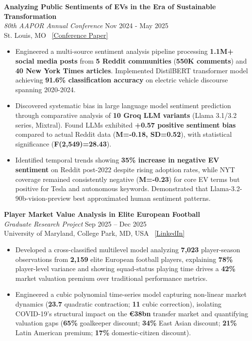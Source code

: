 \documentclass[11pt,letterpaper]{article}
\begin{document}
\textbf{Analyzing Public Sentiments of EVs in the Era of Sustainable Transformation}\\
\textit{80th AAPOR Annual Conference} \hfill Nov 2024 - May 2025\\
St. Louis, MO \textbar\ \href{https://aapor.confex.com/aapor/2025/meetingapp.cgi/Paper/3714}{[Conference Paper]}
\begin{itemize}[leftmargin=16pt, noitemsep, topsep=2pt]
    \item Engineered a multi-source sentiment analysis pipeline processing \textbf{1.1M+ social media posts} from \textbf{5 Reddit communities} (\textbf{550K comments}) and \textbf{40 New York Times articles}. Implemented DistilBERT transformer model achieving \textbf{91.6\% classification accuracy} on electric vehicle discourse spanning 2020-2024.
    
    \item Discovered systematic bias in large language model sentiment prediction through comparative analysis of \textbf{10 Groq LLM variants} (Llama 3.1/3.2 series, Mixtral). Found LLMs exhibited \textbf{+0.57 positive sentiment bias} compared to actual Reddit data (\textbf{M=-0.18, SD=0.52}), with statistical significance (\textbf{F(2,549)=28.43}).
    
    \item Identified temporal trends showing \textbf{35\% increase in negative EV sentiment} on Reddit post-2022 despite rising adoption rates, while NYT coverage remained consistently negative (\textbf{M=-0.23}) for core EV terms but positive for Tesla and autonomous keywords. Demonstrated that Llama-3.2-90b-vision-preview best approximated human sentiment patterns.
\end{itemize}



\vspace{6pt}
\textbf{Player Market Value Analysis in Elite European Football}\\
\textit{Graduate Research Project} \hfill Sep 2025 -- Dec 2025\\
University of Maryland, College Park, MD, USA \textbar\ \href{https://www.linkedin.com/in/namit-shrivastava-baab47204/details/projects/}{[LinkedIn]}
\begin{itemize}[leftmargin=16pt, noitemsep, topsep=2pt]
    \item Developed a cross-classified multilevel model analyzing \textbf{7,023} player-season observations from \textbf{2,159} elite European football players, explaining \textbf{78\%} player-level variance and showing squad-status playing time drives a \textbf{42\%} market valuation premium over traditional performance metrics.
    \item Engineered a cubic polynomial time-series model capturing non-linear market dynamics (\textbf{23.7} quadratic contraction; \textbf{11} cubic correction), isolating COVID-19's structural impact on the \textbf{€38bn} transfer market and quantifying valuation gaps (\textbf{65\%} goalkeeper discount; \textbf{34\%} East Asian discount; \textbf{21\%} Latin American premium; \textbf{17\%} domestic-citizen discount).
\end{itemize}
\end{document}
